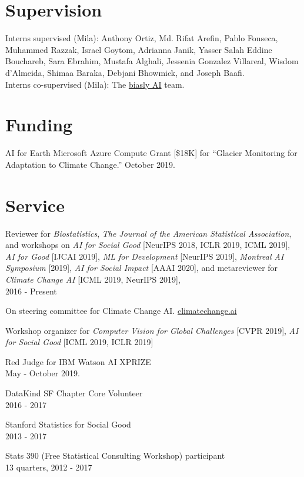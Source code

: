 \documentclass[letterpaper]{article}
\renewenvironment{itemize}{
  \begin{list}{}{
    \setlength{\leftmargin}{1.5em}
  }
}{
  \end{list}
}
\begin{document}
\section*{Supervision}
Interns supervised (Mila): Anthony Ortiz, Md. Rifat Arefin, Pablo Fonseca, Muhammed Razzak, Israel Goytom, Adrianna Janik, Yasser Salah Eddine Bouchareb, Sara Ebrahim, Mustafa Alghali, Jessenia Gonzalez Villareal, Wisdom d'Almeida, Shimaa Baraka, Debjani Bhowmick, and Joseph Baafi. \\
Interns co-supervised (Mila): The \href{https://sites.google.com/view/biaslyai/home}{biasly AI} team.

\section*{Funding}
AI for Earth Microsoft Azure Compute Grant [\$18K] for
``Glacier Monitoring for Adaptation to Climate Change.'' October 2019.

\section*{Service}

\begin{itemize}
\item Reviewer for \textit{Biostatistics}, \textit{The Journal of the American Statistical Association}, and workshops on \textit{AI for Social Good} [NeurIPS 2018, ICLR 2019, ICML 2019], \textit{AI for Good} [IJCAI 2019], \textit{ML for Development} [NeurIPS 2019], \textit{Montreal AI Symposium} [2019], \textit{AI for Social Impact} [AAAI 2020], and metareviewer for \textit{Climate Change AI} [ICML 2019, NeurIPS 2019],\\
  2016 - Present
\item  On steering committee for Climate Change AI. \href{https://climatechange.ai}{climatechange.ai} \\
\item Workshop organizer for \textit{Computer Vision for Global Challenges} [CVPR 2019], \textit{AI for Social Good} [ICML 2019, ICLR 2019]
\item Red Judge for IBM Watson AI XPRIZE \\
May - October 2019.
\item DataKind SF Chapter Core Volunteer \\
  2016 - 2017
\item Stanford Statistics for Social Good \\
  2013 - 2017
\item Stats 390 (Free Statistical Consulting Workshop) participant \\
  13 quarters, 2012 - 2017
\end{itemize}
\end{document}
